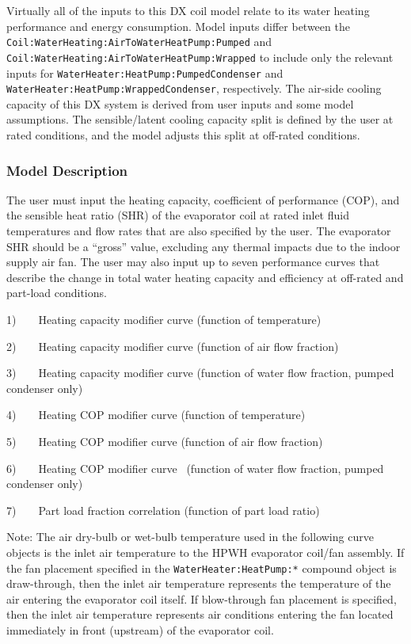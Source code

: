 Virtually all of the inputs to this DX coil model relate to its water heating performance and energy consumption. Model inputs differ between the \lstinline!Coil:WaterHeating:AirToWaterHeatPump:Pumped! and \lstinline!Coil:WaterHeating:AirToWaterHeatPump:Wrapped! to include only the relevant inputs for \lstinline!WaterHeater:HeatPump:PumpedCondenser! and \lstinline!WaterHeater:HeatPump:WrappedCondenser!, respectively. The air-side cooling capacity of this DX system is derived from user inputs and some model assumptions. The sensible/latent cooling capacity split is defined by the user at rated conditions, and the model adjusts this split at off-rated conditions.

\subsubsection{Model Description}\label{model-description-8}

The user must input the heating capacity, coefficient of performance (COP), and the sensible heat ratio (SHR) of the evaporator coil at rated inlet fluid temperatures and flow rates that are also specified by the user. The evaporator SHR should be a ``gross'' value, excluding any thermal impacts due to the indoor supply air fan. The user may also input up to seven performance curves that describe the change in total water heating capacity and efficiency at off-rated and part-load conditions.

1)~~~~Heating capacity modifier curve (function of temperature)

2)~~~~Heating capacity modifier curve (function of air flow fraction)

3)~~~~Heating capacity modifier curve (function of water flow fraction, pumped condenser only)

4)~~~~Heating COP modifier curve (function of temperature)

5)~~~~Heating COP modifier curve (function of air flow fraction)

6)~~~~Heating COP modifier curve~ (function of water flow fraction, pumped condenser only)

7)~~~~Part load fraction correlation (function of part load ratio)

Note: The air dry-bulb or wet-bulb temperature used in the following curve objects is the inlet air temperature to the HPWH evaporator coil/fan assembly. If the fan placement specified in the \lstinline!WaterHeater:HeatPump:*! compound object is draw-through, then the inlet air temperature represents the temperature of the air entering the evaporator coil itself. If blow-through fan placement is specified, then the inlet air temperature represents air conditions entering the fan located immediately in front (upstream) of the evaporator coil.

